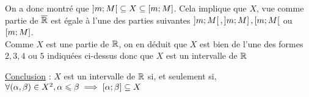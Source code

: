 \begin{dem}
\begin{itemize}
        On a donc montré que \(\left]m;M\right[ \subseteq X\subseteq \left[m;M\right]\). Cela implique que \(X\), vue comme partie de \(\overline{\mathbb{R}}\) est égale à l'une des parties suivantes \(\left]m;M\right[,\left]m;M\right],\left[m;M\right[\) ou \(\left[m;M\right]\).\\
        Comme \(X\) est une partie de \(\mathbb{R}\), on en déduit que \(X\) est bien de l'une des formes \( 2, 3, 4\) ou \(5\) indiquées ci-dessus donc que \(X\) est un intervalle de \(\mathbb{R}\)\\
    \end{itemize}
    \underline{Conclusion} : \(X\) est un intervalle de \(\mathbb{R}\) si, et seulement si, \(\forall(\alpha,\beta) \in X^2, \alpha \leqslant \beta \implies \left[\alpha;\beta\right] \subseteq X\)
\end{dem}